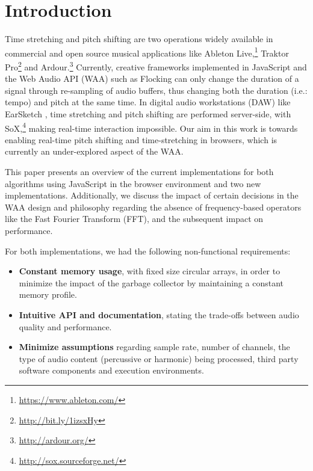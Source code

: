 \documentclass{sig-alternate}
\begin{document}
%	
%

%
%
\printccsdesc



\section{Introduction}

\begin{sloppypar}
Time stretching and pitch shifting are two operations widely available in commercial and open source musical applications like Ableton Live,\footnote{\url{https://www.ableton.com/}} Traktor Pro\footnote{\url{http://bit.ly/1izsxHy}} and Ardour.\footnote{\url{http://ardour.org/}} Currently, creative frameworks implemented in JavaScript and the Web Audio API (WAA) such as Flocking \cite{flocking:icmc2014} can only change the duration of a signal through re-sampling of audio buffers, thus changing both the duration (i.e.: tempo) and pitch at the same time. In digital audio workstations (DAW) like EarSketch \cite{earsketch:wac2015}, time stretching and pitch shifting are performed server-side, with SoX,\footnote{\url{http://sox.sourceforge.net/}} making real-time interaction impossible.
Our aim in this work is towards enabling real-time pitch shifting and time-stretching in browsers, which is currently an under-explored aspect of the WAA.  
\end{sloppypar}

\begin{sloppypar}
This paper presents an overview of the current implementations for both algorithms using JavaScript in the browser environment and two new implementations. Additionally, we discuss the impact of certain decisions in the WAA design and philosophy regarding the absence of frequency-based operators like the Fast Fourier Transform (FFT), and the subsequent impact on performance.
\end{sloppypar}

\begin{sloppypar}
For both implementations, we had the following non-functional requirements: 
\begin{itemize}
	\item \textbf{Constant memory usage}, with fixed size circular arrays, in order to minimize the impact of the garbage collector by maintaining a constant memory profile.
	\item \textbf{Intuitive API and documentation}, stating the trade-offs between audio quality and performance.
	\item \textbf{Minimize assumptions} regarding sample rate, number of channels, the type of audio content (percussive or harmonic) being processed, third party software components and execution environments. %
\end{itemize}
\end{sloppypar}
\end{document}
